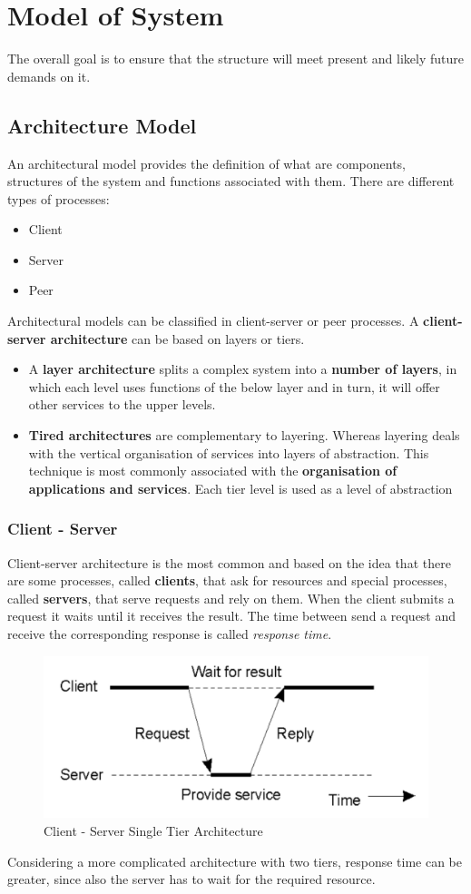 \chapter{Model of System}
The overall goal is to ensure that the structure will meet present and likely future demands on it.
\section{Architecture Model}
An architectural model provides the definition of what are components, structures of the system and functions associated with them. There are different types of processes:
\begin{itemize}
    \item Client
    \item Server
    \item Peer
\end{itemize}
Architectural models can be classified in client-server or peer processes. A \textbf{client-server architecture} can be based on layers or tiers.
\begin{itemize}
    \item A \textbf{layer architecture} splits a complex system into a \textbf{number of layers}, in which each level uses functions of the below layer and in turn, it will offer other services to the upper levels.
    \item \textbf{Tired architectures} are complementary to layering. Whereas layering deals with the vertical organisation of services into layers of abstraction. This technique is most commonly associated with the \textbf{organisation of applications and services}. Each tier level is used as a level of abstraction
\end{itemize}

\subsection{Client - Server}
Client-server architecture is the most common and based on the idea that there are some processes, called \textbf{clients}, that ask for resources and special processes, called \textbf{servers}, that serve requests and rely on them. When the client submits a request it waits until it receives the result. The
time between send a request and receive the corresponding response is called \textit{response time}.
\begin{figure}[!h]
            \centering
            \includegraphics[width=.7\linewidth]{images/modelOfSystems/SingleTierArchitecture.jpeg}
            \caption{Client - Server Single Tier Architecture}
    \end{figure}
    \newpage
Considering a more complicated architecture with two tiers, response time can be greater, since also the server has to wait for the required resource.

